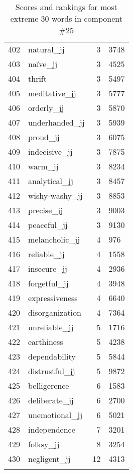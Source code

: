 \begin{longtable}[!htbp]{| rlr@{.}l |}
    402 & natural\_jj & 3 & 3748 \\
    403 & naïve\_jj & 3 & 4525 \\
    404 & thrift & 3 & 5497 \\
    405 & meditative\_jj & 3 & 5777 \\
    406 & orderly\_jj & 3 & 5870 \\
    407 & underhanded\_jj & 3 & 5939 \\
    408 & proud\_jj & 3 & 6075 \\
    409 & indecisive\_jj & 3 & 7875 \\
    410 & warm\_jj & 3 & 8234 \\
    411 & analytical\_jj & 3 & 8457 \\
    412 & wishy-washy\_jj & 3 & 8853 \\
    413 & precise\_jj & 3 & 9003 \\
    414 & peaceful\_jj & 3 & 9130 \\
    415 & melancholic\_jj & 4 & 976 \\
    416 & reliable\_jj & 4 & 1558 \\
    417 & insecure\_jj & 4 & 2936 \\
    418 & forgetful\_jj & 4 & 3948 \\
    419 & expressiveness & 4 & 6640 \\
    420 & disorganization & 4 & 7364 \\
    421 & unreliable\_jj & 5 & 1716 \\
    422 & earthiness & 5 & 4238 \\
    423 & dependability & 5 & 5844 \\
    424 & distrustful\_jj & 5 & 9872 \\
    425 & belligerence & 6 & 1583 \\
    426 & deliberate\_jj & 6 & 2700 \\
    427 & unemotional\_jj & 6 & 5021 \\
    428 & independence & 7 & 3201 \\
    429 & folksy\_jj & 8 & 3254 \\
    430 & negligent\_jj & 12 & 4313 \\
    \hline
    \caption{Scores and rankings for most extreme 30 words in component \#25} \\
\end{longtable}
